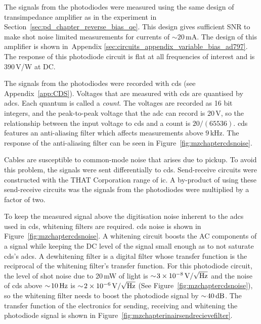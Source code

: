 \par
The signals from the photodiodes were measured using the same design of transimpedance amplifier as in the experiment in Section~\ref{sec:pd_chapter_reverse_bias_qe}. This design gives sufficient SNR to make shot noise limited measurements for currents of $\sim\!20\,\si{\milli\ampere}$. The design of this amplifier is shown in~Appendix \ref{sec:circuits_appendix_variable_bias_ad797}. The response of this photodiode circuit is flat at all frequencies of interest and is 390\,V/W at DC. 
\par
The signals from the photodiodes were recorded with \gls{cds} (see Appendix~\ref{app:CDS}). Voltages that are measured with \gls{cds} are quantised by \glspl{adc}. Each quantum is called a \emph{count}. The voltages are recorded as 16 bit integers, and the peak-to-peak voltage that the \gls{adc} can record is 20\,V, so the relationship between the input voltage to \gls{cds} and a count is $20/(65536)$. \gls{cds} features an anti-aliasing filter which affects measurements above $9\,\si{\kilo\hertz}$. The response of the anti-aliasing filter can be seen in Figure~\ref{fig:mzchaptercdsnoise}.
\par
Cables are susceptible to common-mode noise that arises due to pickup. To avoid this problem, the signals were sent differentially to \gls{cds}. Send-receive circuits were constructed with the THAT Corporation range of \gls{ic}. A by-product of using these send-receive circuits was the signals from the photodiodes were multiplied by a factor of two.
\par
To keep the measured signal above the digitisation noise inherent to the \glspl{adc} used in \gls{cds},  whitening filters are required.  \gls{cds} noise is shown in Figure~\ref{fig:mzchaptercdsnoise}. A whitening circuit boosts the AC components of a signal while keeping the DC level of the signal small enough as to not saturate \gls{cds}'s \glspl{adc}. A dewhitening filter is a digital filter whose transfer function is the reciprocal of the whitening filter's transfer function.  For this photodiode circuit, the level of shot noise due to 20\,mW of light is $\sim\!3\times10^{-8}\,\rm{V/\sqrt{Hz}}$ and the noise of \gls{cds} above $\sim\!10\,\rm{Hz}$ is $\sim\!2\times10^{-6}\,\rm{V/\sqrt{Hz}}$ (See Figure~\ref{fig:mzchaptercdsnoise}), so the whitening filter needs to boost the photodiode signal by $\sim\!40\,\rm{dB}$. The transfer function of the electronics for sending, receiving and whitening the photodiode signal is shown in Figure~\ref{fig:mzchapterinairsendrecievefilter}.
